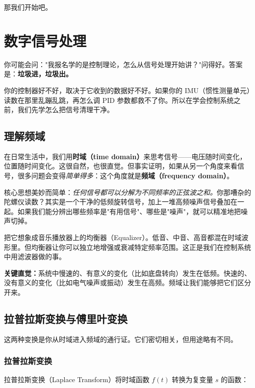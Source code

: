 \documentclass[UTF8]{ctexart}
\begin{document}
那我们开始吧。

\newpage

\section{数字信号处理}

你可能会问："我报名学的是控制理论，怎么从信号处理开始讲？"问得好。答案是：\textbf{垃圾进，垃圾出。}

你的控制器好不好，取决于它收到的数据好不好。如果你的 IMU（惯性测量单元）读数在那里乱蹦乱跳，再怎么调 PID 参数都救不了你。所以在学会控制系统之前，我们先学怎么把信号清理干净。

\subsection{理解频域}

在日常生活中，我们用\textbf{时域（time domain）}来思考信号——电压随时间变化，位置随时间变化。这很自然，也很直觉。但事实证明，如果从另一个角度来看信号，很多问题会变得\textit{简单得多}：这个角度就是\textbf{频域（frequency domain）}。

核心思想美妙而简单：\textit{任何信号都可以分解为不同频率的正弦波之和。}你那嘈杂的陀螺仪读数？其实是一个干净的低频旋转信号，加上一堆高频噪声信号叠加在一起。如果我们能分辨出哪些频率是"有用信号"、哪些是"噪声"，就可以精准地把噪声切掉。

把它想象成音乐播放器上的均衡器（Equalizer）。低音、中音、高音都混在时域波形里。但均衡器让你可以独立地增强或衰减特定频率范围。这正是我们在控制系统中用滤波器做的事。

\textbf{关键直觉：}系统中慢速的、有意义的变化（比如底盘转向）发生在低频。快速的、没有意义的变化（比如电气噪声或振动）发生在高频。频域让我们能够把它们区分开来。

\subsection{拉普拉斯变换与傅里叶变换}

这两种变换是你从时域进入频域的通行证。它们密切相关，但用途略有不同。

\subsubsection{拉普拉斯变换}

拉普拉斯变换（Laplace Transform）将时域函数 $f(t)$ 转换为复变量 $s$ 的函数：
\end{document}
